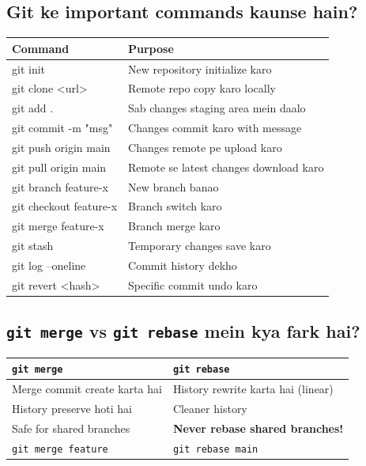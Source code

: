 \documentclass[12pt,a4paper]{article}
\begin{document}
\setcounter{subsection}{87}

\subsection{Git ke important commands kaunse hain?}

\begin{answerbox}
\begin{center}
\begin{tabular}{>{\ttfamily}l p{7cm}}
\toprule
\textbf{Command} & \textbf{Purpose} \\
\midrule
git init & New repository initialize karo \\
git clone <url> & Remote repo copy karo locally \\
git add . & Sab changes staging area mein daalo \\
git commit -m "msg" & Changes commit karo with message \\
git push origin main & Changes remote pe upload karo \\
git pull origin main & Remote se latest changes download karo \\
git branch feature-x & New branch banao \\
git checkout feature-x & Branch switch karo \\
git merge feature-x & Branch merge karo \\
git stash & Temporary changes save karo \\
git log --oneline & Commit history dekho \\
git revert <hash> & Specific commit undo karo \\
\bottomrule
\end{tabular}
\end{center}
\end{answerbox}

\subsection{\texttt{git merge} vs \texttt{git rebase} mein kya fark hai?}

\begin{answerbox}
\begin{center}
\begin{tabular}{p{6cm} p{6cm}}
\toprule
\textbf{\texttt{git merge}} & \textbf{\texttt{git rebase}} \\
\midrule
Merge commit create karta hai & History rewrite karta hai (linear) \\
History preserve hoti hai & Cleaner history \\
Safe for shared branches & \textbf{Never rebase shared branches!} \\
\texttt{git merge feature} & \texttt{git rebase main} \\
\bottomrule
\end{tabular}
\end{center}
\end{answerbox}
\end{document}
